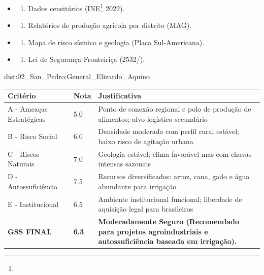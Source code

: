 {\begin{itemize}
\tightlist
\item
  \begin{enumerate}
  \def\labelenumi{\arabic{enumi})}
  \tightlist
  \item
    Dados censitários (INE\footnote{\fineINE} 2022).
  \end{enumerate}
\item
  \begin{enumerate}
  \def\labelenumi{\arabic{enumi})}
  \setcounter{enumi}{1}
  \tightlist
  \item
    Relatórios de produção agrícola por distrito (MAG).
  \end{enumerate}
\item
  \begin{enumerate}
  \def\labelenumi{\arabic{enumi})}
  \setcounter{enumi}{2}
  \tightlist
  \item
    Mapa de risco sísmico e geologia (Placa Sul-Americana).
  \end{enumerate}
\item
  \begin{enumerate}
  \def\labelenumi{\arabic{enumi})}
  \setcounter{enumi}{3}
  \tightlist
  \item
    Lei de Segurança Fronteiriça (2532/).
  \end{enumerate}
\end{itemize}}{dist:02_San_Pedro:General_Elizardo_Aquino}
\begin{table}[ht!]
\small \begin{tabular}{p{3.0cm}p{0.8cm}p{6.0cm}} \toprule
\textbf{Critério} & \textbf{Nota} & \textbf{Justificativa} \\ \midrule
A - Ameaças Estratégicas & 5.0 & Ponto de conexão regional e polo de produção de alimentos; alvo logístico secundário \\
B - Risco Social & 6.0 & Densidade moderada com perfil rural estável; baixo risco de agitação urbana \\
C - Riscos Naturais & 7.0 & Geologia estável; clima favorável mas com chuvas intensas sazonais \\
D - Autossuficiência & 7.5 & Recursos diversificados: arroz, cana, gado e água abundante para irrigação \\
E - Institucional & 6.5 & Ambiente institucional funcional; liberdade de aquisição legal para brasileiros \\
\midrule \textbf{GSS FINAL} & \textbf{6.3} & \textbf{Moderadamente Seguro (Recomendado para projetos agroindustriais e autossuficiência baseada em irrigação).} \\ \bottomrule \end{tabular}
\end{table}
